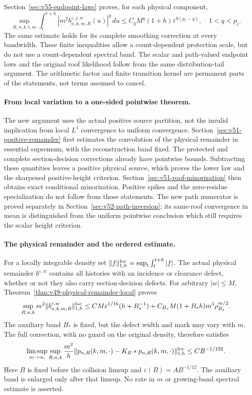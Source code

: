 \documentclass[11pt,reqno]{amsart}
\numberwithin{equation}{section}
\theoremstyle{definition}\newtheorem{definition}[theorem]{Definition}
\theoremstyle{remark}\newtheorem{remark}[theorem]{Remark}
\begin{document}
Section~\ref{sec:v55-endpoint-laws} proves, for each physical component,
\[
 \sup_{R,n,k,t,m}\int_t^{t+h}
 |m^2b^{\varepsilon,j,w}_{n,k,m,R}(u)|^q\,du
 \le C_qM^q(1+h)\varepsilon^{9(p_c-q)},\quad 1<q<p_c.
\]
The same estimate holds for its complete smoothing correction at every
bandwidth. These finite inequalities allow a count-dependent protection
scale, but do not use a count-dependent spectral band. The scalar and
path-valued endpoint laws and the original roof likelihood follow from
the same distribution-tail argument. The arithmetic factor and finite
transition kernel are permanent parts of the statements, not terms
assumed to cancel.

\paragraph{From local variation to a one-sided pointwise theorem.}
The new argument uses the actual positive source partition, not the
invalid implication from local $L^1$ convergence to uniform convergence.
Section~\ref{sec:v51-positive-remainder} first estimates the convolution
of the physical remainder in essential supremum, with the reconstruction
band fixed. The protected and complete section-decision corrections
already have pointwise bounds. Subtracting these quantities leaves a
positive physical source, which proves the lower law and the sharpened
positive-height criterion. Section~\ref{sec:v51-roof-minorization}
then obtains exact conditional minorization. Positive spikes and the zero-residue specialization do not follow
from those statements. The new path numerator is proved separately in
Section~\ref{sec:v52-path-inversion}; its same-roof convergence in mean
is distinguished from the uniform pointwise conclusion which still
requires the scalar height criterion.

\paragraph{The physical remainder and the ordered estimate.}
For a locally integrable density set
$\|f\|_{1,h}^{\rm loc}=\sup_t\int_t^{t+h}|f|$.
The actual physical remainder $b^{\varepsilon,w}$ contains all
histories with an incidence or clearance defect, whether or not they
also carry section-decision defects. For arbitrary $|w|\le M$,
Theorem~\ref{thm:v49-physical-remainder-local} proves
\[
 \sup_{R,n,k}m^2\|b^{\varepsilon,w}_{n,k,m,R}\|_{1,h}^{\rm loc}
 \le CM\varepsilon^{1/16}(h+B_*^{-1})
       +C_{B_*}M(1+B_*h)m^3\rho_{B_*}^{m/2}.
\]
The auxiliary band $B_*$ is fixed, but the defect width and mark may
vary with $m$. The full correction, with no guard on the original
density, therefore satisfies
\[
 \limsup_{m\to\infty}\sup_{R,n,k}
 \frac{m^2}{h}\|p_{n,R}(k,m,\cdot)-K_B*p_{n,R}(k,m,\cdot)\|_{1,h}^{\rm loc}
                         \le CB^{-1/192}.
\]
Here $B$ is fixed before the collision limsup and
$\varepsilon(B)=AB^{-1/12}$. The auxiliary band is enlarged only
after that limsup. No rate in $m$ or growing-band spectral estimate
is asserted.
\end{document}
